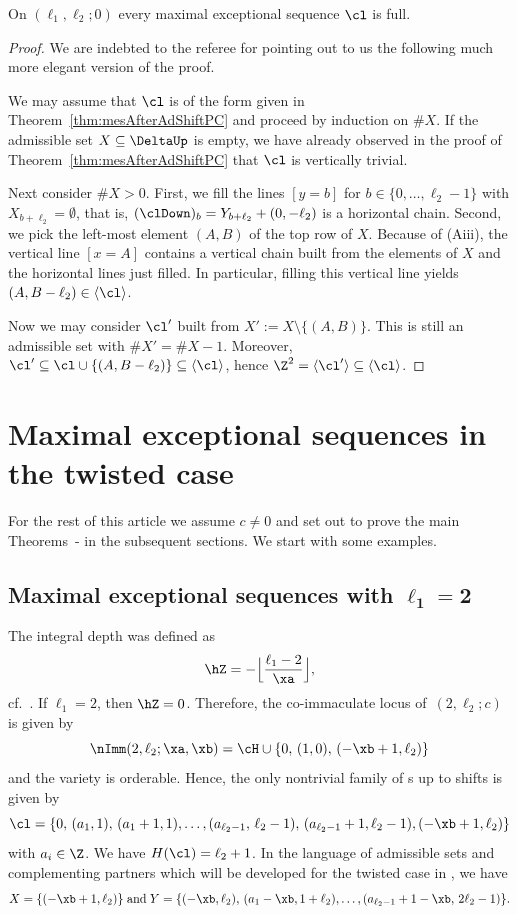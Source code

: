 \begin{theorem}
\label{thm:FullnessTheoremPaPb}
On $(\ell_1,\ell_2;0)$ every maximal 
exceptional sequence $\cl$ is full.
\end{theorem}

\begin{proof}
{We are indebted to the referee for pointing out to us the following much more elegant version of the proof.

We may assume that $\cl$ is of the form
given in Theorem~\ref{thm:mesAfterAdShiftPC} and proceed 
by induction on $\#X$.
If the admissible set 
$X\subseteq \DeltaUp$ is empty, we have already observed in the proof
of Theorem~\ref{thm:mesAfterAdShiftPC} that $\cl$ is
vertically trivial. 

Next consider $\#X>0$. First, we fill the lines $[y=b]$ for
$b\in\{0,\ldots,\ell_2-1\}$
with $X_{b+\ell_2}=\emptyset$, that is,
$(\clDown)_b = Y_{b+\ell_2}+(0,-\ell_2)$ is a horizontal chain.
Second, we pick the left-most element $(A,B)$ of the top row of $X$.
Because of (Aiii), the vertical line $[x=A]$ contains a vertical chain built
from the elements of $X$ and the horizontal lines just filled. 
In particular, filling this vertical line yields
$(A,B-\ell_2)\in\langle\cl\rangle$.

Now we may consider $\cl'$ built from $X':=X\setminus\{(A,B)\}$.
This is still an admissible set with $\#X'=\#X-1$. Moreover,
$\cl'\subseteq\cl\cup\{(A,B-\ell_2)\}\subseteq\langle\cl\rangle$,
hence $\Z^2=\langle\cl'\rangle\subseteq\langle\cl\rangle$.}\end{proof}

\section{Maximal exceptional sequences 
in the twisted case}
\label{sec:MES}
For the rest of this article we assume 
$c\not=0$ and set out to prove the main 
Theorems~\mbox{\thLex-\thFull} in the subsequent sections.
We start with some examples.

\subsection{Maximal exceptional sequences 
with \texorpdfstring{$\mathbf{\ell_1=2}$}{l1=2}}\label{subsec:ExamL1}
The integral depth was defined as
$$
\hZ=-\Big\lfloor{\frac{\ell_1-2}{\xa}}\Big\rfloor,
$$
cf.\ . 
If $\ell_1=2$, then $\hZ=0$. Therefore, the 
{co-immaculate} locus of~$(2,\ell_2;c)$ 
is given by
$$
\nImm(2,\ell_2;\xa,\xb)=\cH\cup
\{0,\,(1,0),\,(-\xb+1,\ell_2)\}
$$
and the variety is orderable. 
Hence, the only nontrivial family of 
{\mes}s up to shifts is given by
$$
\cl=\{0,\,(a_1,1),\,(a_1+1,1),\ldots,
(a_{\ell_2-1},\,\ell_2-1),\,
(a_{\ell_2-1}+1,\ell_2-1),(-\xb+1,\ell_2)\}
$$
with $a_i\in\Z$. We have $H(\cl)=\ell_2+1$.
In the language of admissible sets and 
complementing partners which will be developed 
for the twisted case in 
,
we have 
$$
X=\{(-\xb+1,\ell_2)\}\;\mbox{and}\; 
Y=\{(-\xb,\ell_2),\,(a_1-\xb,1+\ell_2),\ldots,
(a_{\ell_2-1}+1-\xb,\,2\ell_2-1)\}.
$$


